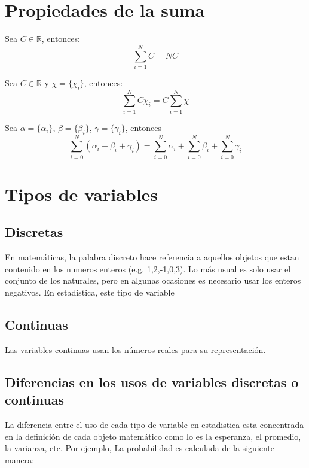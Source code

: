 \section{Propiedades de la suma}
\begin{propiedad}
    Sea $C\in \mathbb{R}$, entonces:
    \begin{equation}
        \sum_{i=1}^N C = NC
    \end{equation}
\end{propiedad}
\begin{propiedad}
    Sea $C\in \mathbb{R}$ y $\chi = \{\chi_i\}$, entonces:
    \begin{equation}
        \sum_{i=1}^N C\chi_i = C \sum_{i=1}^N \chi
    \end{equation}
\end{propiedad}
\begin{propiedad}
    Sea $\alpha = \{\alpha_i\}$, $\beta = \{\beta_i\}$, $\gamma = \{\gamma_i\}$, entonces
    \begin{equation}
        \sum_{i=0}^N \left(\alpha_i + \beta_i + \gamma_i \right) =
        \sum_{i=0}^N \alpha_i + \sum_{i=0}^N \beta_i  +\sum_{i=0}^N \gamma_i
    \end{equation}
\end{propiedad}
\section{Tipos de variables}
\subsection{Discretas}
En matemáticas, la palabra discreto hace referencia a aquellos objetos que estan contenido en los numeros enteros (e.g. 1,2,-1,0,3). Lo más usual es solo usar el conjunto de los naturales, pero en algunas ocasiones es necesario usar los enteros negativos. En estadistica, este tipo de variable
\subsection{Continuas}
Las variables continuas usan los números reales para su representación.
\subsection{Diferencias en los usos de variables discretas o continuas}
La diferencia entre el uso de cada tipo de variable en estadistica esta concentrada en la definición de cada objeto matemático como lo es la esperanza, el promedio, la varianza, etc. Por ejemplo, La probabilidad es calculada de la siguiente manera:\\

